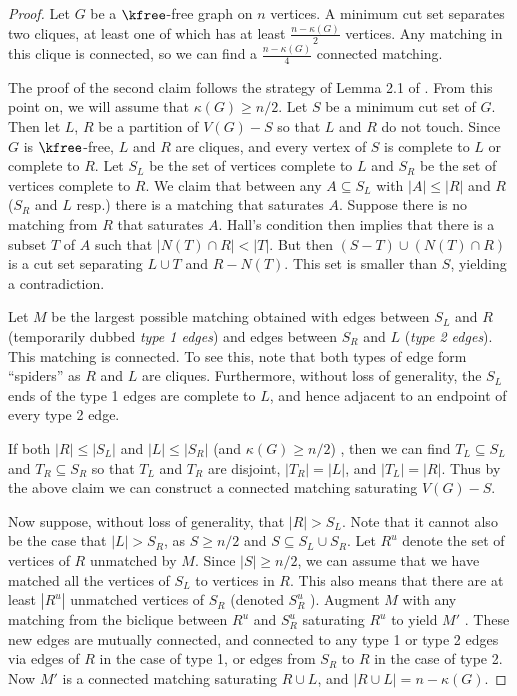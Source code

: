 \begin{proof} Let $G$ be a $\kfree$-free graph on $n$ vertices. A minimum cut set separates two cliques, at least one of which has at least  $\frac{n-\kappa(G)}{2}$ vertices.  Any matching in this clique is connected, so we can find a  $\frac{n-\kappa(G)}{4}$ connected matching. 

The proof of the second claim follows the strategy of Lemma 2.1 of \cite{Blas}. 
%
From this point on, we will assume that $\kappa(G) \geq n/2$.
%
Let $S$ be a minimum cut set of $G$. 
%
Then let $L$, $R$ be a partition of $V(G)-S$ so that $L$ and $R$ do not touch. 
%
Since $G$ is $\kfree$-free, $L$ and $R$ are cliques, and every vertex of $S$ is complete to $L$ or complete to $R$. 
%
Let $S_L$ be the set of vertices complete to $L$ and $S_R$ be the set of vertices complete to $R$. 
%
We claim that between any $A \subseteq S_L$ with $|A| \leq |R|$ and $R$ ($S_R$ and $L$ resp.) there is a matching that saturates $A$. 
%
Suppose there is no matching from $R$ that saturates $A$. 
%
Hall’s condition then implies that there is a subset $T$ of $A$ such that $|N(T) \cap R| < |T |$. 
%
But then $(S -T) \cup (N(T)\cap R)$ is a cut set separating $L \cup T$ and $R - N (T)$. 
%
This set is smaller than $S$, yielding a contradiction.

Let $M$ be the largest possible matching obtained with edges between $S_L$ and $R$ (temporarily dubbed {\it type 1 edges}) and edges between $S_R$ and $L$ ({\it type 2 edges}). 
%
This matching is connected.
%
To see this, note that both types of edge form ``spiders'' as $R$ and $L$ are cliques.
%
Furthermore, without loss of generality, the $S_L$ ends of the type 1 edges are complete to $L$, and hence adjacent to an endpoint of every type 2 edge.
%

If both $|R| \leq |S_L|$ and $|L| \leq |S_R|$ (and $\kappa(G) \geq n/2$) , then we can find $T_L \subseteq S_L$ and $T_R \subseteq S_R$ so that $T_L$ and $T_R$ are disjoint, $|T_R| = |L|$, and $|T_L| = |R|$. 
%
Thus by the above claim we can construct a connected matching saturating $V(G)-S$.  
%

Now suppose, without loss of generality, that $|R| > S_L$.
%
Note that it cannot also be the case that $|L| > S_R$, as $S \geq n/2$ and $S \subseteq S_L \cup S_R$.
%
Let $R^u$ denote the set of vertices of $R$ unmatched by $M$.
%
Since $|S| \geq n/2$, we can assume that we have matched all the vertices of $S_L$ to vertices in $R$.  
%
This also means that there are at least $|R^u|$ unmatched vertices of $S_R$ (denoted $S_R^u$ ).
%
 Augment $M$ with any matching from the biclique between $R^u$ and $S_R^u$ saturating $R^u$ to yield $M'$ . 
%
These new edges are mutually connected, and connected to any type 1 or type 2 edges via edges of $R$ in the case of type 1, or edges from $S_R$ to $R$ in the case of type 2. 
%
Now $M'$ is a connected matching saturating $R \cup L$, and $|R \cup L| = n- \kappa(G)$.
\end{proof}

